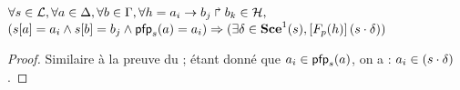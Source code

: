 \begin{lemma}
  $\forall s \in \mathcal{L}, \forall a \in \Delta, \forall b \in \Gamma,
    \forall h = a_i\rightarrow b_j\Rsh b_k \in \mathcal{H},$\\
  $({s[a]} = a_i \wedge {s[b]} = b_j \wedge \mathsf{pfp}_s(a) = a_i) \Rightarrow
    (\exists \delta \in \mathbf{Sce}^1(s),
    \left[F_{p}(h)\right](s \cdot \delta))$
\end{lemma}

\begin{proof} %
  Similaire à la preuve du  ;
  étant donné que $a_i \in \mathsf{pfp}_s(a)$, on a : $a_i \in (s \cdot \delta)$.
\end{proof}

